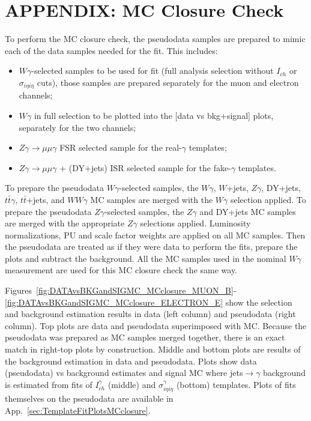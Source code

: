 \section{APPENDIX: MC Closure Check}
\label{sec:MCclosureCheck}

To perform the MC closure check, the pseudodata samples are prepared to mimic each of the data samples needed for the fit. This includes:
\begin{itemize}
  \item $W\gamma$-selected samples to be used for fit (full analysis selection without $I_{ch}$ or $\sigma_{i\eta i\eta}$ cuts), those samples are prepared separately for the muon and electron channels;
  \item $W\gamma$ in full selection to be plotted into the [data vs bkg+signal] plots, separately for the two channels;
  \item $Z\gamma\rightarrow\mu\mu\gamma$ FSR selected sample for the real-$\gamma$ templates;
  \item $Z\gamma\rightarrow\mu\mu\gamma$ + (DY+jets) ISR selected sample for the fake-$\gamma$ templates.
\end{itemize}

To prepare the pseudodata $W\gamma$-selected samples, the $W\gamma$, $W$+jets, $Z\gamma$, DY+jets, $t\bar{t}\gamma$, $t\bar{t}$+jets, and $WW\gamma$ MC samples are merged with the $W\gamma$ selection applied. To prepare the pseudodata $Z\gamma$-selected samples, the $Z\gamma$ and DY+jets MC samples are merged with the appropriate $Z\gamma$ selections applied. Luminosity normalizations, PU and scale factor weights are applied on all MC samples. Then the pseudodata are treated as if they were data to perform the fits, prepare the plots and subtract the background. All the MC samples used in the nominal $W\gamma$ measurement are used for this MC closure check the same way.

Figures~\ref{fig:DATAvsBKGandSIGMC_MCclosure_MUON_B}-\ref{fig:DATAvsBKGandSIGMC_MCclosure_ELECTRON_E} show the selection and background estimation results in data (left column) and pseudodata (right column). Top plots are data and pseudodata superimposed with MC. Because the pseudodata was prepared as MC samples merged together, there is an exact match in right-top plots by construction. Middle and bottom plots are results of the background estimation in data and pseudodata. Plots show data (pseudodata) vs background estimates and signal MC where jets$\rightarrow\gamma$ background is estimated from fits of $I_{ch}^{\gamma}$ (middle) and  $\sigma_{i\eta i\eta}^{\gamma}$ (bottom) templates. Plots of fits themselves on the pseudodata are available in App.~\ref{sec:TemplateFitPlotsMCclosure}.

